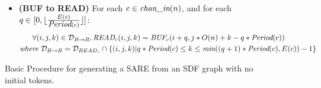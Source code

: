 \begin{figure}[t]
{\begin{minipage}{6.3in}
\begin{itemize}
\begin{align}
  \mt{WRITE}_{c}(i, q, j - q * U(c)) \\ \nonumber
&\mt{where } {\cal D}_{W {\small \rightarrow} B}(c,q) = 
  {\cal D}_{{BUF}_{c}} \cap 
  \{ (i,j) | q*U(c) \le j \le (q+1)*U(c) - 1 \}
\end{align}
\item {\bf(BUF to READ)} For each $c \in \mbox{\it chan\_in}(n)$, 
       and for each $q \in [0, \lfloor \frac{E(c)}{\mbox{\it Period}(c)} \rfloor ]$:
\begin{align}
\label{eq:b2r}
&~~~~~\forall (i,j,k) \in {\cal D}_{B {\small \rightarrow} R},
\mbox{\it READ}_{c}(i,j,k) = \mbox{\it BUF}_{c}(i+q,j*O(n) + k - q * \mbox{\it Period}(c)) \\ \nonumber
&\mbox{\it where }{\cal D}_{B {\small \rightarrow} R} = 
  {\cal D}_{READ_{c}} \cap \{ (i,j,k) | q * \mbox{\it Period}(c) \le k \le \mbox{\it min}((q+1)*\mbox{\it Period}(c), E(c)) - 1 \}
\end{align}
\end{itemize}

\end{minipage}}
\caption{Basic Procedure for generating a SARE from an SDF graph with no initial tokens.
\protect\label{fig:sdftosare}}
\end{figure}





